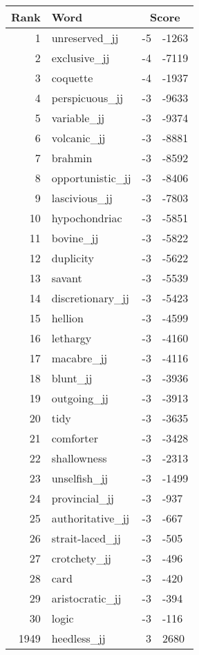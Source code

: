 \begin{longtable}[!htbp]{| rlr@{.}l |}
    \hline
    \textbf{Rank} & \textbf{Word} & \multicolumn{2}{c|}{\textbf{Score}} \\
    \hline
    \endhead
    1 & unreserved\_jj & -5 & -1263 \\
    2 & exclusive\_jj & -4 & -7119 \\
    3 & coquette & -4 & -1937 \\
    4 & perspicuous\_jj & -3 & -9633 \\
    5 & variable\_jj & -3 & -9374 \\
    6 & volcanic\_jj & -3 & -8881 \\
    7 & brahmin & -3 & -8592 \\
    8 & opportunistic\_jj & -3 & -8406 \\
    9 & lascivious\_jj & -3 & -7803 \\
    10 & hypochondriac & -3 & -5851 \\
    11 & bovine\_jj & -3 & -5822 \\
    12 & duplicity & -3 & -5622 \\
    13 & savant & -3 & -5539 \\
    14 & discretionary\_jj & -3 & -5423 \\
    15 & hellion & -3 & -4599 \\
    16 & lethargy & -3 & -4160 \\
    17 & macabre\_jj & -3 & -4116 \\
    18 & blunt\_jj & -3 & -3936 \\
    19 & outgoing\_jj & -3 & -3913 \\
    20 & tidy & -3 & -3635 \\
    21 & comforter & -3 & -3428 \\
    22 & shallowness & -3 & -2313 \\
    23 & unselfish\_jj & -3 & -1499 \\
    24 & provincial\_jj & -3 & -937 \\
    25 & authoritative\_jj & -3 & -667 \\
    26 & strait-laced\_jj & -3 & -505 \\
    27 & crotchety\_jj & -3 & -496 \\
    28 & card & -3 & -420 \\
    29 & aristocratic\_jj & -3 & -394 \\
    30 & logic & -3 & -116 \\
    1949 & heedless\_jj & 3 & 2680 \\

\end{longtable}
